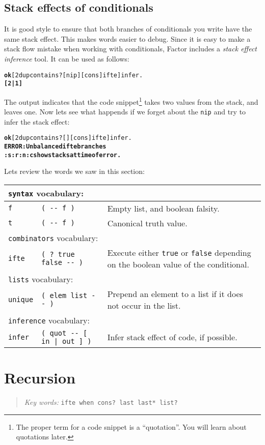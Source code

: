 \documentclass[english]{book}
\newcommand{\chapkeywords}[1]{{\parbox{10cm}{\begin{minipage}[b]{10cm}
\begin{quote}
\emph{Key words:} \texttt{#1}
\end{quote}
\end{minipage}}}}
\newcommand{\wordtable}[1]{{
\begin{tabularx}{12cm}{|l l X|}
#1
\hline
\end{tabularx}}}
\newcommand{\tabvocab}[1]{
\hline
\multicolumn{3}{|l|}{
\rule[-2mm]{0mm}{6mm}
\texttt{#1} vocabulary:}
\\
\hline
}
\begin{document}
\subsection{Stack effects of conditionals}

It is good style to ensure that both branches of conditionals you write have the same stack effect. This makes words easier to debug. Since it is easy to make a stack flow mistake when working with conditionals, Factor includes a \emph{stack effect inference} tool. It can be used as follows:

\begin{alltt}
\textbf{ok} [ 2dup contains? [ nip ] [ cons ] ifte ] infer .
\textbf{[ 2 | 1 ]}
\end{alltt}

The output indicates that the code snippet\footnote{The proper term for a code snippet is a ``quotation''. You will learn about quotations later.} takes two values from the stack, and leaves one. Now lets see what happends if we forget about the \texttt{nip} and try to infer the stack effect:

\begin{alltt}
\textbf{ok} [ 2dup contains? [ ] [ cons ] ifte ] infer .
\textbf{ERROR: Unbalanced ifte branches
:s :r :n :c show stacks at time of error.}
\end{alltt}

Lets review the words we saw in this section:

\wordtable{
\tabvocab{syntax}
\texttt{f}&
\texttt{( -{}- f )}&
Empty list, and boolean falsity.\\
\texttt{t}&
\texttt{( -{}- f )}&
Canonical truth value.\\
\tabvocab{combinators}
\texttt{ifte}&
\texttt{( ?~true false -{}- )}&
Execute either \texttt{true} or \texttt{false} depending on the boolean value of the conditional.\\
\tabvocab{lists}
\texttt{unique}&
\texttt{( elem list -{}- )}&
Prepend an element to a list if it does not occur in the
list.\\
\tabvocab{inference}
\texttt{infer}&
\texttt{( quot -{}- {[} in | out {]} )}&
Infer stack effect of code, if possible.\\}

\section{Recursion}

\chapkeywords{ifte when cons?~last last* list?}
\end{document}

